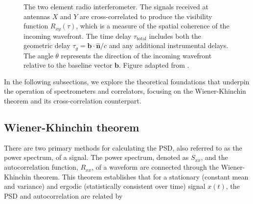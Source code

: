 \begin{figure}[h!]
      \caption[The two element radio interferometer]{The two element radio interferometer. The signals received at antennas $X$ and $Y$ are cross-correlated to produce the visibility function $R_{xy}(\tau)$, which is a measure of the spatial coherence of the incoming wavefront. The time delay $\tau_\text{total}$ includes both the geometric delay $\tau_g = \mathbf{b} \cdot \widehat{\mathbf{n}} / c$ and any additional instrumental delays. The angle $\theta$ represents the direction of the incoming wavefront relative to the baseline vector $\mathbf{b}$. Figure adapted from \citet{Cassanelli2022}.}
	  \label{fig:correlator_schematic}
\end{figure}

In the following subsections, we explore the theoretical foundations that underpin the operation of spectrometers and correlators, focusing on the Wiener-Khinchin theorem and its cross-correlation counterpart.
\subsection{Wiener-Khinchin theorem}
There are two primary methods for calculating the PSD, also referred to as the power spectrum, of a signal. The power spectrum, denoted as $S_{xx}$, and the autocorrelation function, $R_{xx}$, of a waveform are connected through the Wiener-Khinchin theorem. This theorem establishes that for a stationary (constant mean and variance) and ergodic (statistically consistent over time) signal $x(t)$, the PSD and autocorrelation are related by

